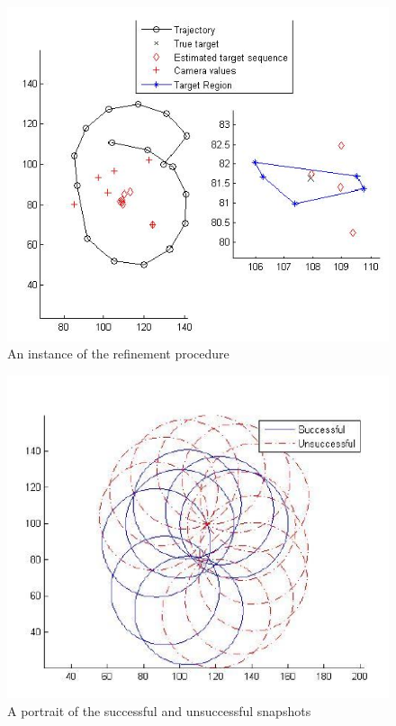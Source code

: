 \begin{figure}
\centering
\includegraphics[scale=0.75]{Figures/mission_phase2_a}
\caption{An instance of the refinement procedure}
\label{fig_mission_phase2_a}
\end{figure}

\begin{figure}
\centering
\includegraphics[scale=0.75]{Figures/mission_phase2_b}
\caption{A portrait of the successful and unsuccessful snapshots}
\label{fig_mission_phase2_b}
\end{figure}

